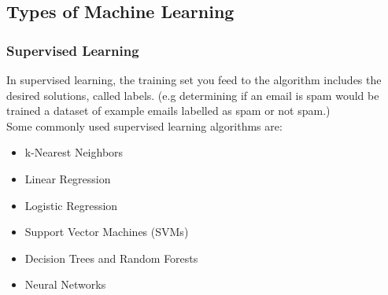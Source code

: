 \documentclass[12pt]{article}
\begin{document}
\subsection{Types of Machine Learning}
    \subsubsection{Supervised Learning}
        In supervised learning, the training set you feed to the algorithm includes the desired solutions, called labels.
        (e.g determining if an email is spam would be trained a dataset of example emails labelled as spam or not spam.) \\[0.1in] 
        Some commonly used supervised learning algorithms are:
        \begin{itemize}
            \item k-Nearest Neighbors
            \item Linear Regression
            \item Logistic Regression
            \item Support Vector Machines (SVMs)
            \item Decision Trees and Random Forests
            \item Neural Networks
        \end{itemize}
    
\end{document}
